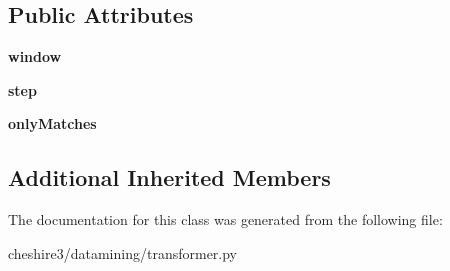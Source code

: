 \subsection*{Public Attributes}
\begin{DoxyCompactItemize}
\item 
\hypertarget{classcheshire3_1_1datamining_1_1transformer_1_1_window_arm_vector_transformer_a45b30f22acb2915015f66540dd871606}{{\bfseries window}}\label{classcheshire3_1_1datamining_1_1transformer_1_1_window_arm_vector_transformer_a45b30f22acb2915015f66540dd871606}

\item 
\hypertarget{classcheshire3_1_1datamining_1_1transformer_1_1_window_arm_vector_transformer_a744b702a23ea23470325f95dc72ed557}{{\bfseries step}}\label{classcheshire3_1_1datamining_1_1transformer_1_1_window_arm_vector_transformer_a744b702a23ea23470325f95dc72ed557}

\item 
\hypertarget{classcheshire3_1_1datamining_1_1transformer_1_1_window_arm_vector_transformer_a38d98db93005277e52eb03943a066b65}{{\bfseries only\-Matches}}\label{classcheshire3_1_1datamining_1_1transformer_1_1_window_arm_vector_transformer_a38d98db93005277e52eb03943a066b65}

\end{DoxyCompactItemize}
\subsection*{Additional Inherited Members}


The documentation for this class was generated from the following file\-:\begin{DoxyCompactItemize}
\item 
cheshire3/datamining/transformer.\-py\end{DoxyCompactItemize}
